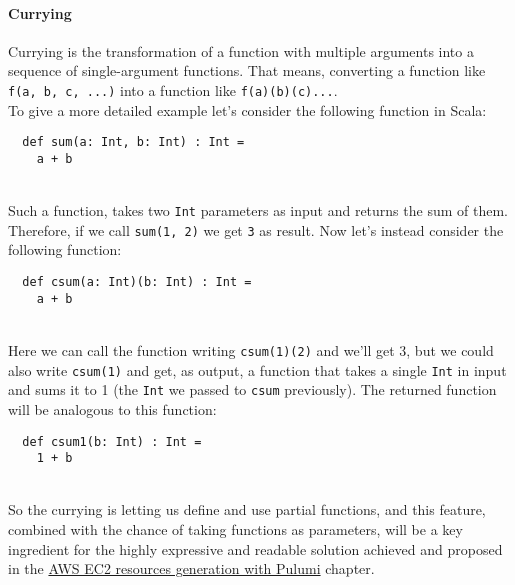 \paragraph{Currying}
Currying is the transformation of a function with multiple arguments into a sequence of single-argument functions. That means, converting a function like \texttt{f(a, b, c, ...)} into a function like \texttt{f(a)(b)(c)...}.\\
To give a more detailed example let's consider the following function in Scala:
\begin{verbatim}
  def sum(a: Int, b: Int) : Int = 
    a + b
\end{verbatim}\mbox{}\\
Such a function, takes two \texttt{Int} parameters as input and returns the sum of them.
Therefore, if we call \texttt{sum(1, 2)} we get \texttt{3} as result.
Now let's instead consider the following function:
\begin{verbatim}
  def csum(a: Int)(b: Int) : Int = 
    a + b
\end{verbatim}\mbox{}\\
Here we can call the function writing \texttt{csum(1)(2)} and we'll get 3, but we could also write \texttt{csum(1)} and get, as output, a function that takes a single \texttt{Int} in input and sums it to 1 (the \texttt{Int} we passed to \texttt{csum} previously).
The returned function will be analogous to this function:
\begin{verbatim}
  def csum1(b: Int) : Int = 
    1 + b
\end{verbatim}\mbox{}\\
So the currying is letting us define and use partial functions, and this feature, combined with the chance of taking functions as parameters, will be a key ingredient for the highly expressive and readable solution achieved and proposed in the \hyperref[cap:case-study]{AWS EC2 resources generation with Pulumi} chapter.

